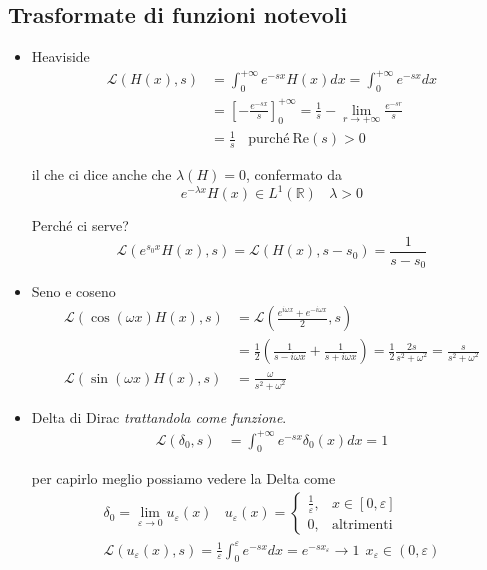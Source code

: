 \documentclass[10pt,a4paper,twoside]{book}
\begin{document}
\subsection{Trasformate di funzioni notevoli}
\begin{itemize}
\item Heaviside\begin{align*}
\mathcal{L}( H( x) ,s) & =\int ^{+\infty }_{0} e^{-sx} H( x) dx=\int ^{+\infty }_{0} e^{-sx} dx\\
 & =\left[ -\frac{e^{-sx}}{s}\right]^{+\infty }_{0} =\frac{1}{s} -\lim _{r\rightarrow +\infty }\frac{e^{-sr}}{s}\\
 & =\frac{1}{s} \ \ \ \ \text{purché} \ \mathrm{Re}( s)  >0
\end{align*}

il che ci dice anche che $\lambda ( H) =0$, confermato da\begin{equation*}
e^{-\lambda x} H( x) \in L^{1}(\mathbb{R}) \ \ \ \ \lambda  >0
\end{equation*}

Perché ci serve?\begin{equation*}
\mathcal{L}\left( e^{s_{0} x} H( x) ,s\right) =\mathcal{L}( H( x) ,s-s_{0}) =\frac{1}{s-s_{0}}
\end{equation*}
\item Seno e coseno\begin{align*}
\mathcal{L}(\cos( \omega x) H( x) ,s) & =\mathcal{L}\left(\frac{e^{i\omega x} +e^{-i\omega x}}{2} ,s\right)\\
 & =\frac{1}{2}\left(\frac{1}{s-i\omega x} +\frac{1}{s+i\omega x}\right) =\frac{1}{2}\frac{2s}{s^{2} +\omega ^{2}} =\frac{s}{s^{2} +\omega ^{2}}\\
\mathcal{L}(\sin( \omega x) H( x) ,s) & =\frac{\omega }{s^{2} +\omega ^{2}}
\end{align*}
\item Delta di Dirac \textit{trattandola come funzione}.\begin{align*}
\mathcal{L}( \delta _{0} ,s) & =\int ^{+\infty }_{0} e^{-sx} \delta _{0}( x) dx=1
\end{align*}

per capirlo meglio possiamo vedere la Delta come\begin{gather*}
\delta _{0} =\lim\limits _{\varepsilon \rightarrow 0} u_{\varepsilon }( x) \ \ \ \ u_{\varepsilon }( x) =\begin{cases}
\frac{1}{\varepsilon } , & x\in [ 0,\varepsilon ]\\
0, & \text{altrimenti}
\end{cases}\\
\mathcal{L}( u_{\varepsilon }( x) ,s) =\frac{1}{\varepsilon }\int ^{\varepsilon }_{0} e^{-sx} dx=e^{-sx_{\varepsilon }}\rightarrow 1\ \ x_{\varepsilon } \in ( 0,\varepsilon )
\end{gather*}
\end{itemize}
\end{document}
